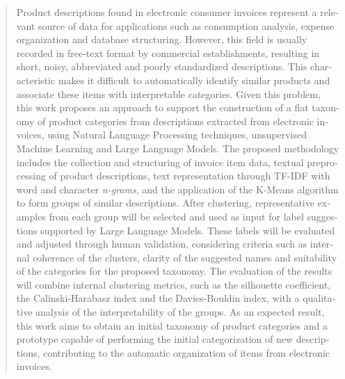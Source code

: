 \documentclass[english,brazilian]{UNISINOSmonografia}
\begin{document}
%
\begin{otherlanguage}{english}
\begin{abstract}
Product descriptions found in electronic consumer invoices represent a relevant source of data for applications such as consumption analysis, expense organization and database structuring. However, this field is usually recorded in free-text format by commercial establishments, resulting in short, noisy, abbreviated and poorly standardized descriptions. This characteristic makes it difficult to automatically identify similar products and associate these items with interpretable categories. Given this problem, this work proposes an approach to support the construction of a flat taxonomy of product categories from descriptions extracted from electronic invoices, using Natural Language Processing techniques, unsupervised Machine Learning and Large Language Models. The proposed methodology includes the collection and structuring of invoice item data, textual preprocessing of product descriptions, text representation through TF-IDF with word and character \textit{n-grams}, and the application of the K-Means algorithm to form groups of similar descriptions. After clustering, representative examples from each group will be selected and used as input for label suggestions supported by Large Language Models. These labels will be evaluated and adjusted through human validation, considering criteria such as internal coherence of the clusters, clarity of the suggested names and suitability of the categories for the proposed taxonomy. The evaluation of the results will combine internal clustering metrics, such as the silhouette coefficient, the Calinski-Harabasz index and the Davies-Bouldin index, with a qualitative analysis of the interpretability of the groups. As an expected result, this work aims to obtain an initial taxonomy of product categories and a prototype capable of performing the initial categorization of new descriptions, contributing to the automatic organization of items from electronic invoices.
\end{abstract}
\end{otherlanguage}
\end{document}

